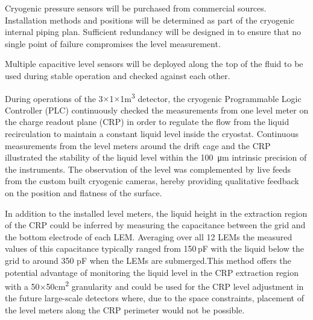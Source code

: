 Cryogenic pressure sensors will be purchased from commercial sources.
Installation methods and positions will be determined as part of the
cryogenic internal piping plan.  Sufficient redundancy will be designed in
to ensure that no single point of failure compromises the level measurement.

Multiple capacitive level sensors will be deployed along the top of
the fluid to be used during stable operation and checked against each
other.

During operations of the 3$\times$1$\times$1\si{\cubic\meter} detector, the cryogenic Programmable Logic Controller (PLC) continuously checked the measurements from one level meter on the charge readout plane (CRP) in order to regulate the flow from the liquid recirculation to maintain a constant liquid level inside the cryostat. Continuous measurements from the level meters around the drift cage and the CRP illustrated the stability of the liquid level within the \SI{100}{\micro\meter} intrinsic precision of the instruments. The observation of the level was complemented by live feeds from the custom built cryogenic cameras, hereby providing qualitative feedback on the position and flatness of the surface.

In addition to the installed level meters, the liquid height in the extraction region of the CRP could be inferred by measuring the capacitance between the grid and the bottom electrode of each LEM. Averaging over all 12 LEMs the measured values of this capacitance typically ranged from 150\,pF with the liquid below the grid to around 350 pF when the LEMs are submerged.This method offers the potential advantage of monitoring the liquid level in the CRP extraction region with a 50$\times$50\si{\cm^2} granularity and could be used for the CRP level adjustment in the future large-scale detectors where, due to the space constraints, placement of the level meters along the CRP perimeter would not be possible.

